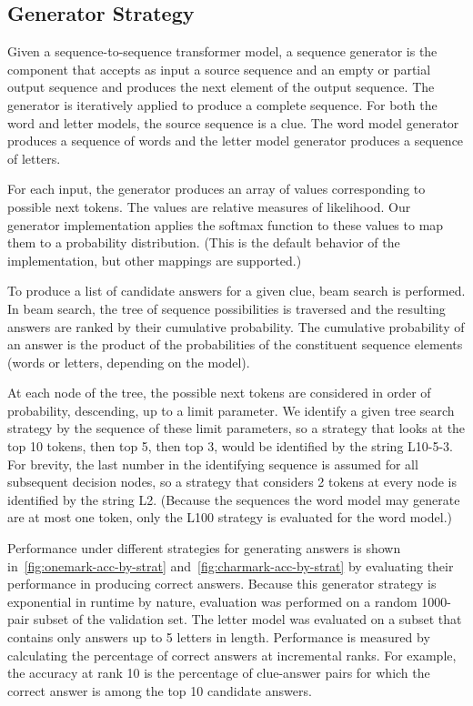 \documentclass[letterpaper]{article} %
\begin{document}
\begin{NoHyper}
\section{Generator Strategy}
\label{sec:generator}

Given a sequence-to-sequence transformer model, a sequence generator is the component that accepts as input a source sequence and an empty or partial output sequence and produces the next element of the output sequence. The generator is iteratively applied to produce a complete sequence. For both the word and letter models, the source sequence is a clue. The word model generator produces a sequence of words and the letter model generator produces a sequence of letters.

For each input, the generator produces an array of values corresponding to possible next tokens. The values are relative measures of likelihood. Our generator implementation applies the softmax function to these values to map them to a probability distribution. (This is the default behavior of the implementation, but other mappings are supported.)

To produce a list of candidate answers for a given clue, beam search is performed. In beam search, the tree of sequence possibilities is traversed and the resulting answers are ranked by their cumulative probability. The cumulative probability of an answer is the product of the probabilities of the constituent sequence elements (words or letters, depending on the model).

At each node of the tree, the possible next tokens are considered in order of probability, descending, up to a limit parameter.
We identify a given tree search strategy by the sequence of these limit parameters, so a strategy that looks at the top 10 tokens, then top 5, then top 3, would be identified by the string L10-5-3.
For brevity, the last number in the identifying sequence is assumed for all subsequent decision nodes, so a strategy that considers 2 tokens at every node is identified by the string L2. (Because the sequences the word model may generate are at most one token, only the L100 strategy is evaluated for the word model.)

Performance under different strategies for generating answers is shown in~\ref{fig:onemark-acc-by-strat} and~\ref{fig:charmark-acc-by-strat} by evaluating their performance in producing correct answers.
Because this generator strategy is exponential in runtime by nature, evaluation was performed on a random 1000-pair subset of the validation set.
The letter model was evaluated on a subset that contains only answers up to 5 letters in length.
Performance is measured by calculating the percentage of correct answers at incremental ranks.
For example, the accuracy at rank 10 is the percentage of clue-answer pairs for which the correct answer is among the top 10 candidate answers.


\end{NoHyper}
\end{document}
